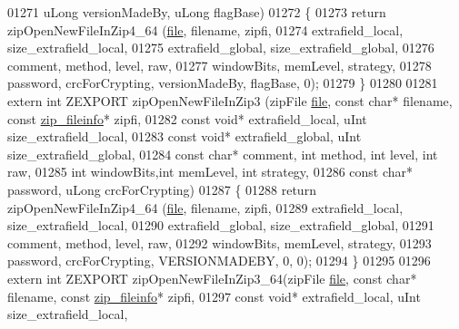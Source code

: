 \begin{DoxyCode}
01271                                          uLong versionMadeBy, uLong flagBase)
01272 \{
01273     \textcolor{keywordflow}{return} zipOpenNewFileInZip4\_64 (\hyperlink{structfile}{file}, filename, zipfi,
01274                                  extrafield\_local, size\_extrafield\_local,
01275                                  extrafield\_global, size\_extrafield\_global,
01276                                  comment, method, level, raw,
01277                                  windowBits, memLevel, strategy,
01278                                  password, crcForCrypting, versionMadeBy, flagBase, 0);
01279 \}
01280 
01281 \textcolor{keyword}{extern} \textcolor{keywordtype}{int} ZEXPORT zipOpenNewFileInZip3 (zipFile \hyperlink{structfile}{file}, \textcolor{keyword}{const} \textcolor{keywordtype}{char}* filename, \textcolor{keyword}{const} 
      \hyperlink{structzip__fileinfo}{zip\_fileinfo}* zipfi,
01282                                          \textcolor{keyword}{const} \textcolor{keywordtype}{void}* extrafield\_local, uInt size\_extrafield\_local,
01283                                          \textcolor{keyword}{const} \textcolor{keywordtype}{void}* extrafield\_global, uInt size\_extrafield\_global,
01284                                          \textcolor{keyword}{const} \textcolor{keywordtype}{char}* comment, \textcolor{keywordtype}{int} method, \textcolor{keywordtype}{int} level, \textcolor{keywordtype}{int} raw,
01285                                          \textcolor{keywordtype}{int} windowBits,\textcolor{keywordtype}{int} memLevel, \textcolor{keywordtype}{int} strategy,
01286                                          \textcolor{keyword}{const} \textcolor{keywordtype}{char}* password, uLong crcForCrypting)
01287 \{
01288     \textcolor{keywordflow}{return} zipOpenNewFileInZip4\_64 (\hyperlink{structfile}{file}, filename, zipfi,
01289                                  extrafield\_local, size\_extrafield\_local,
01290                                  extrafield\_global, size\_extrafield\_global,
01291                                  comment, method, level, raw,
01292                                  windowBits, memLevel, strategy,
01293                                  password, crcForCrypting, VERSIONMADEBY, 0, 0);
01294 \}
01295 
01296 \textcolor{keyword}{extern} \textcolor{keywordtype}{int} ZEXPORT zipOpenNewFileInZip3\_64(zipFile \hyperlink{structfile}{file}, \textcolor{keyword}{const} \textcolor{keywordtype}{char}* filename, \textcolor{keyword}{const} 
      \hyperlink{structzip__fileinfo}{zip\_fileinfo}* zipfi,
01297                                          \textcolor{keyword}{const} \textcolor{keywordtype}{void}* extrafield\_local, uInt size\_extrafield\_local,

\end{DoxyCode}
